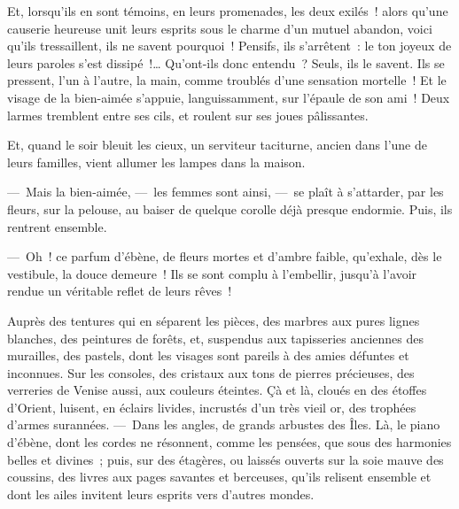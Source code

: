 \documentclass[french,twoside]{book} %
\begin{document}
Et, lorsqu’ils en sont témoins, en leurs promenades, les deux exilés ! alors qu’une causerie heureuse unit leurs esprits sous le charme d’un mutuel abandon, voici qu’ils tressaillent, ils ne savent pourquoi ! Pensifs, ils s’arrêtent : le ton joyeux de leurs paroles s’est dissipé !… Qu’ont-ils donc entendu ? Seuls, ils le savent. Ils se pressent, l’un à l’autre, la main, comme troublés d’une sensation mortelle ! Et le visage de la bien-aimée s’appuie, languissamment, sur l’épaule de son ami ! Deux larmes tremblent entre ses cils, et roulent sur ses joues pâlissantes.\par
Et, quand le soir bleuit les cieux, un serviteur taciturne, ancien dans l’une de leurs familles, vient allumer les lampes dans la maison.\par
— Mais la bien-aimée, — les femmes sont ainsi, — se plaît à s’attarder, par les fleurs, sur   la pelouse, au baiser de quelque corolle déjà presque endormie. Puis, ils rentrent ensemble.\par
— Oh ! ce parfum d’ébène, de fleurs mortes et d’ambre faible, qu’exhale, dès le vestibule, la douce demeure ! Ils se sont complu à l’embellir, jusqu’à l’avoir rendue un véritable reflet de leurs rêves !\par
Auprès des tentures qui en séparent les pièces, des marbres aux pures lignes blanches, des peintures de forêts, et, suspendus aux tapisseries anciennes des murailles, des pastels, dont les visages sont pareils à des amies défuntes et inconnues. Sur les consoles, des cristaux aux tons de pierres précieuses, des verreries de Venise aussi, aux couleurs éteintes. Çà et là, cloués en des étoffes d’Orient, luisent, en éclairs livides, incrustés d’un très vieil or, des trophées d’armes surannées. — Dans les angles, de grands arbustes des Îles. Là, le piano d’ébène, dont les cordes ne résonnent, comme les pensées, que sous des harmonies belles et divines ; puis, sur des étagères, ou laissés ouverts sur la soie mauve des coussins, des livres aux pages savantes   et berceuses, qu’ils relisent ensemble et dont les ailes invitent leurs esprits vers d’autres mondes.\par
\end{document}
